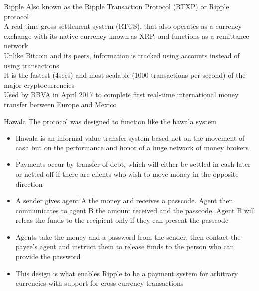 \documentclass[10pt]{beamer}
\begin{document}

\begin{frame}{Ripple}
	Also known as the Ripple Transaction Protocol (RTXP) or Ripple protocol\\ \vspace{3mm}
	A real-time gross settlement system (RTGS), that also operates as a currency exchange with its native currency known as XRP, and functions as a remittance network\\ \vspace{3mm}
	Unlike Bitcoin and its peers, information is tracked using accounts instead of using transactions\\ \vspace{3mm}
	It is the fastest (4secs) and most scalable (1000 transactions per second) of the major cryptocurrencies\\ \vspace{3mm}
	Used by BBVA in April 2017 to complete first real-time international money transfer between Europe and Mexico
\end{frame}


\begin{frame}{Hawala}
	The protocol was designed to function like the hawala system
	\begin{itemize}
		\item Hawala is an informal value transfer system based not on the movement of cash but on the performance and honor of a huge network of money brokers
		\item Payments occur by transfer of debt, which will either be settled in cash later or netted off if there are clients who wish to move money in the opposite direction
		\item A sender gives agent A the money and receives a passcode. Agent then communicates to agent B the amount received and the passcode. Agent B will releas the funds to the recipient only if they can present the passcode
		\item Agents take the money and a password from the sender, then contact the payee's agent and instruct them to release funds to the person who can provide the password
		\item This design is what enables Ripple to be a payment system for arbitrary currencies with support for cross-currency transactions
	\end{itemize}
\end{frame}
\end{document}

